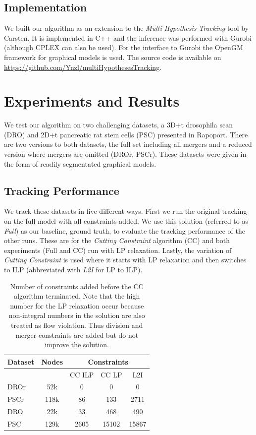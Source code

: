 \documentclass[10pt,twocolumn,letterpaper]{article}
\begin{document}
\subsection{Implementation}

We built our algorithm as an extension to the \textit{Multi Hypothesis Tracking} tool by Carsten. It is implemented in C++ and the inference was performed with Gurobi (although CPLEX can also be used). For the interface to Gurobi the OpenGM framework for graphical models is used. The source code is available on \url{https://github.com/Ynzl/multiHypothesesTracking}.

\section{Experiments and Results}

We test our algorithm on two challenging datasets, a 3D+t drosophila scan (DRO) and 2D+t pancreatic rat stem cells (PSC) presented in Rapoport. There are two versions to both datasets, the full set including all mergers and a reduced version where mergers are omitted (DROr, PSCr). These datasets were given in the form of readily segmentated graphical models.

\subsection{Tracking Performance}

We track these datasets in five different ways. First we run the original tracking on the full model with all constraints added. We use this solution (referred to as \textit{Full}) as our baseline, \ie ground truth, to evaluate the tracking performance of the other runs. These are for the \textit{Cutting Constraint} algorithm (CC) and both experiments (Full and CC) run with LP relaxation. Lastly, the variation of \textit{Cutting Constraint} is used where it starts with LP relaxation and then switches to ILP (abbreviated with \textit{L2I} for LP to ILP).

\begin{table}
  \begin{center}
  \begin{tabular}{|l|c||c|c|c|}
    \hline
    Dataset & Nodes & \multicolumn{3}{|c|}{Constraints}\\
    \hline\hline
            &       & CC ILP & CC LP & L2I\\
    \hline
    DROr & 52k & 0 & 0 & 0\\
    PSCr & 118k & 86 & 133 & 2711\\
    DRO & 22k & 33 & 468 & 490\\
    PSC & 129k & 2605 & 15102 & 15867\\
    \hline
  \end{tabular}
  \end{center}
  \caption{Number of constraints added before the CC algorithm terminated. Note that the high number for the LP relaxation occur because non-integral numbers in the solution are also treated as flow violation. Thus division and merger constraints are added but do not improve the solution.}
  \label{tab:constraints}
\end{table}
\end{document}
